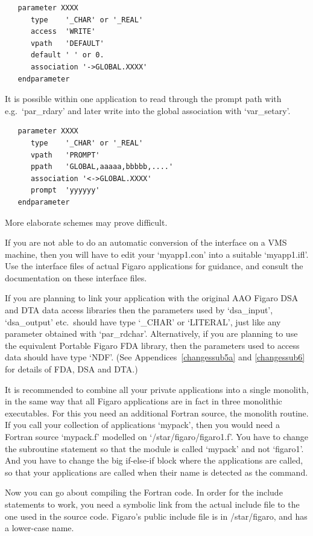 \begin{verbatim}
   parameter XXXX
      type    '_CHAR' or '_REAL'
      access  'WRITE'
      vpath   'DEFAULT'
      default ' ' or 0.
      association '->GLOBAL.XXXX'
   endparameter
\end{verbatim}

   It is possible within one application to read through the prompt path
   with e.g.\ `par\_rdary' and later write into the global association
   with `var\_setary'.

\begin{verbatim}
   parameter XXXX
      type    '_CHAR' or '_REAL'
      vpath   'PROMPT'
      ppath   'GLOBAL,aaaaa,bbbbb,....'
      association '<->GLOBAL.XXXX'
      prompt  'yyyyyy'
   endparameter
\end{verbatim}

   More elaborate schemes may prove difficult.

   If you are not able to do an automatic conversion of the interface on
   a VMS machine, then you will have to edit your `myapp1.con' into a
   suitable `myapp1.ifl'. Use the interface files of actual Figaro
   applications for guidance, and consult the documentation on these
   interface files.

   If you are planning to link your application with the original AAO
   Figaro DSA and DTA data access libraries then the parameters used by
   `dsa\_input', `dsa\_output' etc.\ should have type `\_CHAR' or `LITERAL',
   just like any parameter obtained with `par\_rdchar'.  Alternatively, if
   you are planning to use the equivalent Portable Figaro FDA library, then
   the parameters used to access data should have type `NDF'.  (See
   Appendices~\ref{changessub5a} and \ref{changessub6} for details of FDA,
   DSA and DTA.)

   It is recommended to combine all your private applications into a
   single monolith, in the same way that all Figaro applications are in
   fact in three monolithic executables. For this you need an additional
   Fortran source, the monolith routine. If you call your collection of
   applications `mypack', then you would need a Fortran source
   `mypack.f' modelled on `/star/figaro/figaro1.f'. You have to
   change the subroutine statement so that the module is called `mypack'
   and not `figaro1'. And you have to change the big if-else-if block
   where the applications are called, so that your applications are
   called when their name is detected as the command.

   Now you can go about compiling the Fortran code. In order for the
   include statements to work, you need a symbolic link from the actual
   include file to the one used in the source code. Figaro's public
   include file is in /star/figaro, and has a lower-case name.

